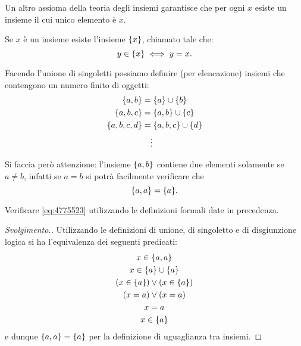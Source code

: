 Un altro assioma della teoria degli insiemi garantisce che per ogni
$x$ esiste un insieme il cui unico elemento è $x$. 
\begin{axiom}[singoletto]
  Se $x$ è un insieme esiste l'insieme ${\left\{ x \right\}}$, 
  chiamato 
  tale che:
  \[
    y \in {\left\{ x \right\}} \iff y=x.
  \]
\end{axiom}
Facendo l'unione di singoletti possiamo definire (per elencazione) insiemi che contengono
un numero finito di oggetti:
\begin{align*}
  {\left\{ a,b \right\}} &= {\left\{ a \right\}} \cup {\left\{ b \right\}} \\
  {\left\{ a, b, c \right\}} &= {\left\{ a,b \right\}} \cup {\left\{ c \right\}}\\
  {\left\{ a, b, c, d \right\}} &= {\left\{ a,b,c \right\}} \cup {\left\{ d \right\}}\\
  &\quad\vdots
\end{align*}

Si faccia però attenzione: l'insieme ${\left\{ a,b \right\}}$ contiene due elementi
solamente se $a\neq b$, infatti se $a=b$ si potrà facilmente verificare
che
\begin{equation}\label{eq:4775523}
{\left\{ a,a \right\}} = {\left\{ a \right\}}.
\end{equation}

\begin{exercise}
  Verificare \eqref{eq:4775523} utilizzando le definizioni formali date in precedenza.
\end{exercise}
\begin{proof}[Svolgimento.]
Utilizzando le definizioni di unione, di singoletto e di disgiunzione logica
si ha l'equivalenza dei seguenti
predicati:
\begin{gather*}
  x \in {\left\{ a,a \right\}}  \\
  x \in {\left\{ a \right\}} \cup {\left\{ a \right\}}\\
  (x \in {\left\{ a \right\}}) \lor (x \in {\left\{ a \right\}})\\
  (x = a) \lor (x = a) \\
  x = a \\
  x \in {\left\{ a \right\}}
\end{gather*}
e dunque ${\left\{ a,a \right\}}={\left\{ a \right\}}$ per la definizione di uguaglianza tra insiemi.
\end{proof}

